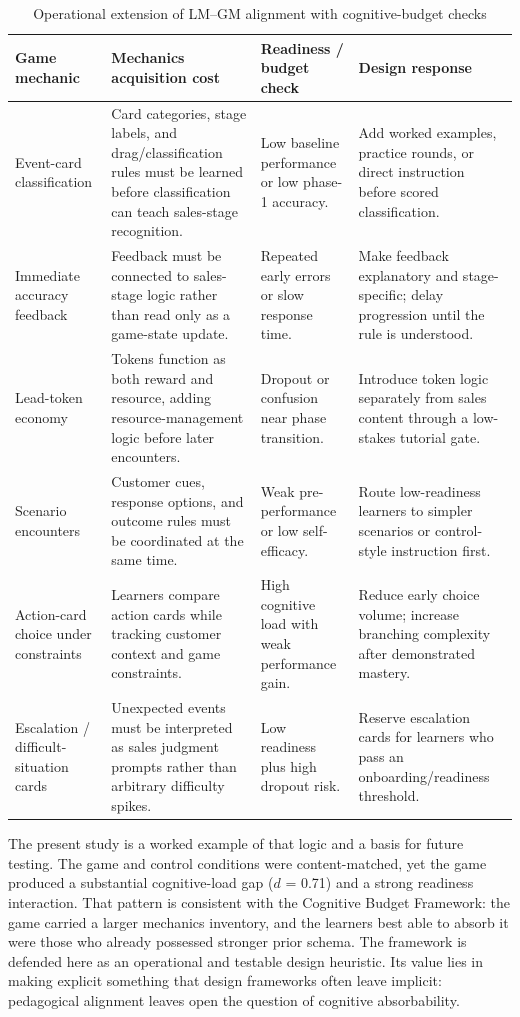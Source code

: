 \documentclass[12pt]{report}
\begin{document}
\begin{table}[htbp]
\centering
\caption{Operational extension of LM--GM alignment with cognitive-budget checks}
\label{tab:lmgm-budget-audit}
\footnotesize
\setlength{\tabcolsep}{3pt}
\begin{tabularx}{\textwidth}{L{2.7cm}Y Y Y}
\toprule
\textbf{Game mechanic} & \textbf{Mechanics acquisition cost} & \textbf{Readiness / budget check} & \textbf{Design response} \\
\midrule
Event-card classification & Card categories, stage labels, and drag/classification rules must be learned before classification can teach sales-stage recognition. & Low baseline performance or low phase-1 accuracy. & Add worked examples, practice rounds, or direct instruction before scored classification. \\
Immediate accuracy feedback & Feedback must be connected to sales-stage logic rather than read only as a game-state update. & Repeated early errors or slow response time. & Make feedback explanatory and stage-specific; delay progression until the rule is understood. \\
Lead-token economy & Tokens function as both reward and resource, adding resource-management logic before later encounters. & Dropout or confusion near phase transition. & Introduce token logic separately from sales content through a low-stakes tutorial gate. \\
Scenario encounters & Customer cues, response options, and outcome rules must be coordinated at the same time. & Weak pre-performance or low self-efficacy. & Route low-readiness learners to simpler scenarios or control-style instruction first. \\
Action-card choice under constraints & Learners compare action cards while tracking customer context and game constraints. & High cognitive load with weak performance gain. & Reduce early choice volume; increase branching complexity after demonstrated mastery. \\
Escalation / difficult-situation cards & Unexpected events must be interpreted as sales judgment prompts rather than arbitrary difficulty spikes. & Low readiness plus high dropout risk. & Reserve escalation cards for learners who pass an onboarding/readiness threshold. \\
\bottomrule
\end{tabularx}
\normalsize
\setlength{\tabcolsep}{6pt}
\end{table}

The present study is a worked example of that logic and a basis for future testing. The game and control conditions were content-matched, yet the game produced a substantial cognitive-load gap ($d$ = 0.71) and a strong readiness interaction. That pattern is consistent with the Cognitive Budget Framework: the game carried a larger mechanics inventory, and the learners best able to absorb it were those who already possessed stronger prior schema. The framework is defended here as an operational and testable design heuristic. Its value lies in making explicit something that design frameworks often leave implicit: pedagogical alignment leaves open the question of cognitive absorbability.
\end{document}

